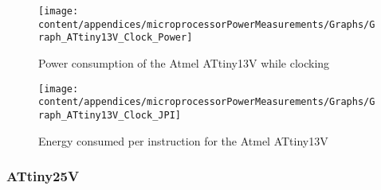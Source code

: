 \begin{figure}
\begin{centering}
\texttt{[image: content/appendices/microprocessorPowerMeasurements/Graphs/Graph\_ATtiny13V\_Clock\_Power]}
\par\end{centering}

\protect\caption{
\label{fig:ATtiny13VClkPower}Power consumption of the Atmel ATtiny13V
while clocking
}
\end{figure}
\begin{figure}
\begin{centering}
\texttt{[image: content/appendices/microprocessorPowerMeasurements/Graphs/Graph\_ATtiny13V\_Clock\_JPI]}
\par\end{centering}

\protect\caption{
\label{fig:ATtiny13VClkJPI}Energy consumed per instruction for the
Atmel ATtiny13V
}


\end{figure}



\subsubsection{ATtiny25V}

